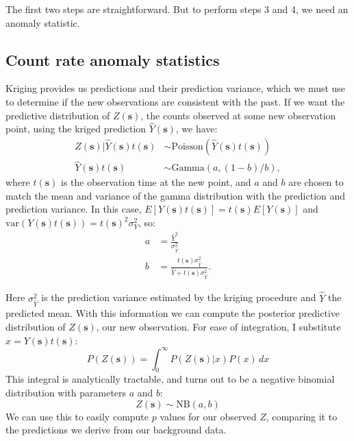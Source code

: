 The first two steps are straightforward. But to perform steps 3 and 4, we need
an anomaly statistic.

\subsection{Count rate anomaly statistics}

Kriging provides us predictions and their prediction variance, which we must use
to determine if the new observations are consistent with the past. If we want
the predictive distribution of \(Z(\mathbf{s})\), the counts observed at some
new observation point, using the kriged prediction \(\hat Y(\mathbf{s})\), we
have:
\begin{align}
  Z(\mathbf{s}) | \hat Y(\mathbf{s}) t(\mathbf{s}) &\sim \text{Poisson}(\hat Y(\mathbf{s})
  t(\mathbf{s}))\\
  \hat Y(\mathbf{s}) t(\mathbf{s}) &\sim \text{Gamma}(a, (1-b)/b),
\end{align}
where \(t(\mathbf{s})\) is the observation time at the new point, and \(a\) and
\(b\) are chosen to match the mean and variance of the gamma distribution with
the prediction and prediction variance. In this case,
\(E[Y(\mathbf{s})t(\mathbf{s})] = t(\mathbf{s}) E[Y(\mathbf{s})]\) and
\(\text{var}(Y(\mathbf{s})t(\mathbf{s})) = t(\mathbf{s})^2
\sigma_Y^2\), so:
\begin{align}
  a &= \frac{\hat Y^2}{\sigma_{\hat Y}^2}\\
  b &= \frac{t(\mathbf{s}) \sigma_{\hat Y}^2}{\hat Y + t(\mathbf{s}) \sigma_{\hat Y}^2}.
\end{align}

Here \(\sigma_{\hat Y}^2\) is the prediction variance estimated by the kriging
procedure and \(\hat Y\) the predicted mean. With this information we can
compute the posterior predictive distribution of \(Z(\mathbf{s})\), our new
observation. For ease of integration, I substitute
\(x=Y(\mathbf{s})t(\mathbf{s})\):
\begin{equation}
P(Z(\mathbf{s})) = \int_0^\infty P(Z(\mathbf{s})|x) P(x) \, dx
\end{equation}
This integral is analytically tractable, and turns out to be a
negative binomial distribution with parameters \(a\) and \(b\):
\begin{equation}\label{post-predictive}
  Z(\mathbf{s}) \sim \text{NB}(a,b)
\end{equation}
We can use this to easily compute \(p\) values for our observed \(Z\), comparing
it to the predictions we derive from our background data.

